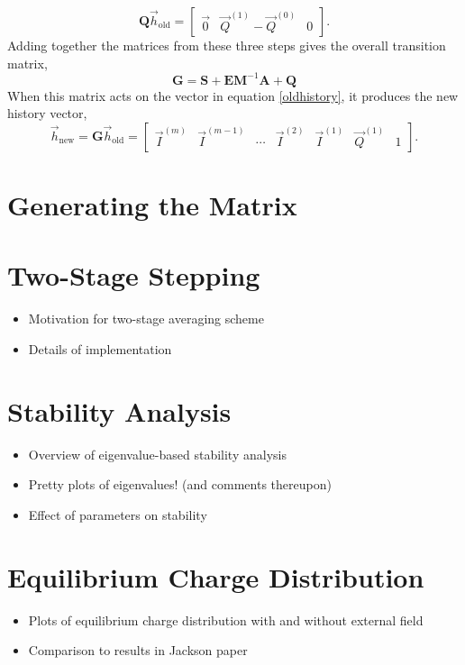 \documentclass{article}
\newcommand{\mat}{\mathbf}
\begin{document}
\begin{equation}
\mat{Q}\vec{h}_\text{old} = 
\begin{bmatrix}
\vec{0} & \vec{Q}^{(1)} - \vec{Q}^{(0)} & 0
\end{bmatrix}.
\end{equation}
Adding together the matrices from these three steps gives the overall transition matrix,
\begin{equation}
\mat{G} = \mat{S} + \mat{E}\mat{M}^{-1}\mat{A} + \mat{Q}
\end{equation}
When this matrix acts on the vector in equation \ref{oldhistory}, it produces the new history vector,
\begin{equation}
\vec{h}_\text{new} = \mat{G}\vec{h}_\text{old} = 
\begin{bmatrix}
\vec{I}^{(m)} & \vec{I}^{(m-1)} & \cdots & \vec{I}^{(2)} & \vec{I}^{(1)} & \vec{Q}^{(1)} & 1
\end{bmatrix}.
\end{equation}

\section{Generating the Matrix}

\section{Two-Stage Stepping}
\begin{itemize}
\item Motivation for two-stage averaging scheme
\item Details of implementation
\end{itemize}

\section{Stability Analysis}
\begin{itemize}
\item Overview of eigenvalue-based stability analysis
\item Pretty plots of eigenvalues! (and comments thereupon)
\item Effect of parameters on stability
\end{itemize}

\section{Equilibrium Charge Distribution}
\begin{itemize}
\item Plots of equilibrium charge distribution with and without external field
\item Comparison to results in Jackson paper
\end{itemize}
\end{document}
